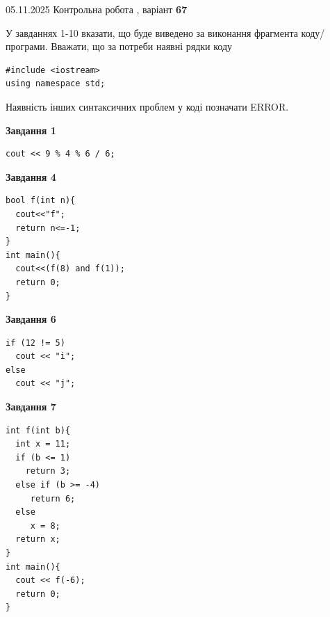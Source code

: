 \documentclass[12pt, ukrainian]{article}
\begin{document}
{\Large{05.11.2025 Контрольна робота , варіант  \No \textbf { 67 }\par}}
{
\begin {large}
У завданнях 1-10 вказати, що буде виведено за виконання фрагмента коду/про\-гра\-ми.
Вважати, що за потреби наявні рядки коду
\begin{verbatim}
#include <iostream>
using namespace std;
\end{verbatim}
Наявність інших синтаксичних проблем у коді позначати ERROR.

\begin{minipage}[t]{7.0cm}

\begin{center}
\textbf{Завдання 1}
\end{center}
\vspace{-8mm}

\begin{verbatim}
cout << 9 % 4 % 6 / 6;
\end{verbatim}



\begin{center}
\textbf{Завдання 4}
\end{center}
\vspace{-8mm}

\begin{verbatim}
bool f(int n){
  cout<<"f";
  return n<=-1;
}
int main(){
  cout<<(f(8) and f(1));
  return 0;
}
\end{verbatim}



\begin{center}
\textbf{Завдання 6}
\end{center}
\vspace{-8mm}

\begin{verbatim}
if (12 != 5)
  cout << "i";
else
  cout << "j";
\end{verbatim}



\begin{center}
\textbf{Завдання 7}
\end{center}
\vspace{-8mm}

\begin{verbatim}
int f(int b){
  int x = 11;
  if (b <= 1)
    return 3;
  else if (b >= -4)
     return 6;
  else
     x = 8;
  return x;
}
int main(){
  cout << f(-6);
  return 0;
}
\end{verbatim}


\end{minipage}
\end{large}}
\end{document}
